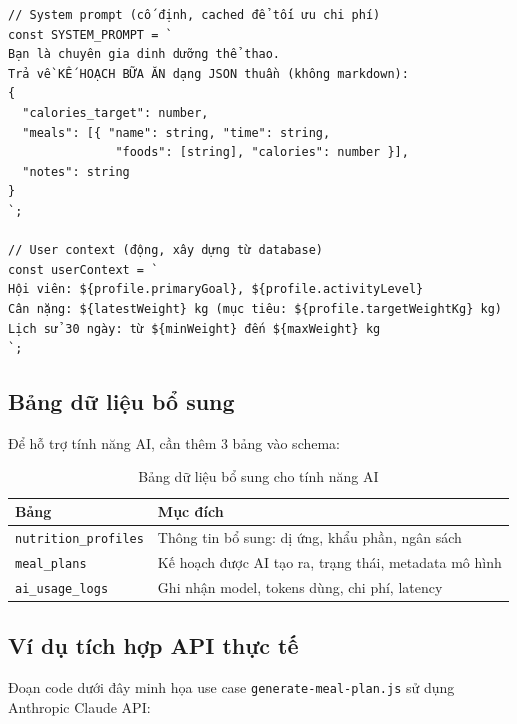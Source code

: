\begin{verbatim}
// System prompt (cố định, cached để tối ưu chi phí)
const SYSTEM_PROMPT = `
Bạn là chuyên gia dinh dưỡng thể thao.
Trả về KẾ HOẠCH BỮA ĂN dạng JSON thuần (không markdown):
{
  "calories_target": number,
  "meals": [{ "name": string, "time": string,
               "foods": [string], "calories": number }],
  "notes": string
}
`;

// User context (động, xây dựng từ database)
const userContext = `
Hội viên: ${profile.primaryGoal}, ${profile.activityLevel}
Cân nặng: ${latestWeight} kg (mục tiêu: ${profile.targetWeightKg} kg)
Lịch sử 30 ngày: từ ${minWeight} đến ${maxWeight} kg
`;
\end{verbatim}

\subsection{Bảng dữ liệu bổ sung}
Để hỗ trợ tính năng AI, cần thêm 3 bảng vào schema:

\begin{table}[H]
\centering
\begin{tabular}{|l|l|}
\hline
\textbf{Bảng} & \textbf{Mục đích} \\ \hline
\texttt{nutrition\_profiles}  & Thông tin bổ sung: dị ứng, khẩu phần, ngân sách \\
\texttt{meal\_plans}          & Kế hoạch được AI tạo ra, trạng thái, metadata mô hình \\
\texttt{ai\_usage\_logs}      & Ghi nhận model, tokens dùng, chi phí, latency \\
\hline
\end{tabular}
\caption{Bảng dữ liệu bổ sung cho tính năng AI}
\end{table}

\subsection{Ví dụ tích hợp API thực tế}
Đoạn code dưới đây minh họa use case \texttt{generate-meal-plan.js} sử dụng Anthropic Claude API:


